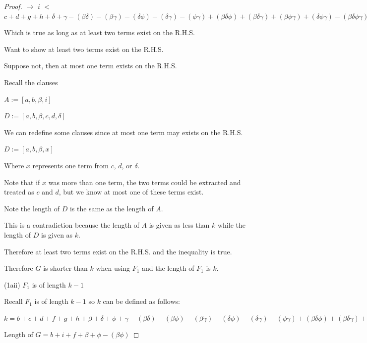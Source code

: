 \documentclass[manuscript]{acmart}
\begin{document}
\begin{proof}
        $\rightarrow$ $i$
        $<$
        $c + d + g + h 
         + \delta + \gamma
        - (\beta \delta) - (\beta \gamma) - (\delta \phi) - (\delta \gamma) - (\phi \gamma)
        + (\beta \delta \phi) + (\beta \delta \gamma) + (\beta \phi \gamma) + (\delta \phi \gamma)
        - (\beta \delta \phi \gamma) 
        $

        Which is true as long as at least two terms exist on the R.H.S.

        Want to show at least two terms exist on the R.H.S.

        Suppose not, then at most one term exists on the R.H.S.

        Recall the clauses

        $A := [a, b, \beta, i]$

        $D := [a, b, \beta, c, d, \delta]$

        We can redefine some clauses since at most one term may exists on the R.H.S.

        $D := [a, b, \beta, x]$

        Where $x$ represents one term from $c$, $d$, or $\delta$.

        Note that if $x$ was more than one term, the two terms could be extracted and treated as $c$ and $d$, but we know at most one of these terms exist.
        
        Note the length of $D$ is the same as the length of $A$.

        This is a contradiction because the length of $A$ is given as less than $k$ while the length of $D$ is given as $k$.

        Therefore at least two terms exist on the R.H.S. and the inequality is true.

        Therefore $G$ is shorter than $k$ when using $F_1$ and the length of $F_1$ is $k$.

        (1aii) $F_1$ is of length $k - 1$

        Recall $F_1$ is of length $k - 1$ so $k$ can be defined as follows:
        
        $k = b + c + d + f + g + h 
        + \beta + \delta + \phi + \gamma
        - (\beta \delta) - (\beta \phi) - (\beta \gamma) - (\delta \phi) - (\delta \gamma) - (\phi \gamma)
        + (\beta \delta \phi) + (\beta \delta \gamma) + (\beta \phi \gamma) + (\delta \phi \gamma)
        - (\beta \delta \phi \gamma)
        + 1
        $

        Length of $G = b + i + f + \beta + \phi - (\beta \phi)$


\end{proof}
\end{document}
